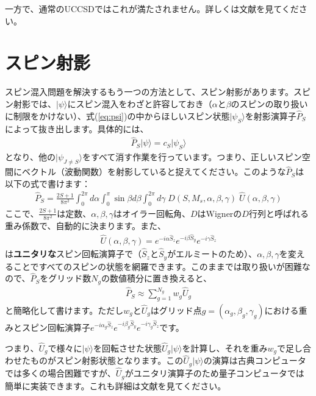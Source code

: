 \documentclass[prb,amsmath,amsfonts,amssymb]{revtex4}
\begin{document}
一方で、通常のUCCSDではこれが満たされません。詳しくは文献を見てください。

\section{スピン射影}
スピン混入問題を解決するもう一つの方法として、スピン射影があります。スピン射影では、$|\psi\rangle$にスピン混入をわざと許容しておき（$\alpha$と$\beta$のスピンの取り扱いに制限をかけない）、式(\ref{eq:psi})の中からほしいスピン状態$|\psi_S\rangle$を射影演算子$\hat P_S$によって抜き出します。具体的には、
\begin{align}
	\hat P_S |\psi\rangle = c_S |\psi_S\rangle
\end{align}
となり、他の$|\psi_{J\ne S}\rangle$をすべて消す作業を行っています。つまり、正しいスピン空間にベクトル（波動関数）を射影していると捉えてください。このような$\hat P_S$は以下の式で書けます：
\begin{align}
	\hat P_S = \frac{2S+1}{8\pi^2}\int_0^{2\pi} d\alpha \int_0^\pi \sin\beta d\beta \int_0^{2\pi} d\gamma\; D(S,M_s,\alpha,\beta,\gamma)\; \hat U(\alpha,\beta,\gamma)
\end{align}
ここで、$\frac{2S+1}{8\pi^2}$は定数、$\alpha,\beta,\gamma$はオイラー回転角、$D$はWignerの$D$行列と呼ばれる重み係数で、自動的に決まります。また、
\begin{align}
	\hat U(\alpha,\beta,\gamma) = e^{-i \alpha \hat S_z}e^{-i \beta \hat S_y}e^{-i \gamma \hat S_z} 
\end{align}
は{\bf ユニタリな}スピン回転演算子で（$\hat S_z$と$\hat S_y$がエルミートのため）、$\alpha,\beta,\gamma$を変えることですべてのスピンの状態を網羅できます。このままでは取り扱いが困難なので、$\hat P_S$をグリッド数$N_g$の数値積分に置き換えると、
\begin{align}
	\hat P_S \approx \sum_{g=1}^{N_g} w_g \hat U_g \label{eq:Ps}
\end{align}
と簡略化して書けます。ただし$w_g$と$\hat U_g$はグリッド点$g=(\alpha_g,\beta_g,\gamma_g)$における重みとスピン回転演算子$e^{-i \alpha_g \hat S_z}e^{-i \beta_g \hat S_y}e^{-i \gamma_g \hat S_z}$です。

つまり、$\hat U_g$で様々に$|\psi\rangle$を回転させた状態$\hat U_g|\psi\rangle$を計算し、それを重み$w_g$で足し合わせたものがスピン射影状態となります。この$\hat U_g|\psi\rangle$の演算は古典コンピュータでは多くの場合困難ですが、$\hat U_g$がユニタリ演算子のため量子コンピュータでは簡単に実装できます。これも詳細は文献を見てください。
\end{document}

